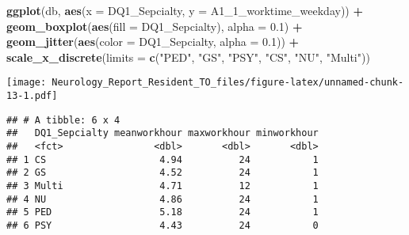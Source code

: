 \documentclass[]{book}
\newenvironment{Shaded}{\begin{snugshade}}{\end{snugshade}}
\newcommand{\DataTypeTok}[1]{\textcolor[rgb]{0.13,0.29,0.53}{#1}}
\newcommand{\DecValTok}[1]{\textcolor[rgb]{0.00,0.00,0.81}{#1}}
\newcommand{\FloatTok}[1]{\textcolor[rgb]{0.00,0.00,0.81}{#1}}
\newcommand{\KeywordTok}[1]{\textcolor[rgb]{0.13,0.29,0.53}{\textbf{#1}}}
\newcommand{\NormalTok}[1]{#1}
\newcommand{\OperatorTok}[1]{\textcolor[rgb]{0.81,0.36,0.00}{\textbf{#1}}}
\newcommand{\StringTok}[1]{\textcolor[rgb]{0.31,0.60,0.02}{#1}}
\begin{document}
\begin{Shaded}
\begin{Highlighting}[]
\KeywordTok{ggplot}\NormalTok{(db, }\KeywordTok{aes}\NormalTok{(}\DataTypeTok{x =}\NormalTok{ DQ1_Sepcialty, }\DataTypeTok{y =}\NormalTok{ A1_}\DecValTok{1}\NormalTok{_worktime_weekday)) }\OperatorTok{+}
\StringTok{  }\KeywordTok{geom_boxplot}\NormalTok{(}\KeywordTok{aes}\NormalTok{(}\DataTypeTok{fill =}\NormalTok{ DQ1_Sepcialty), }\DataTypeTok{alpha =} \FloatTok{0.1}\NormalTok{) }\OperatorTok{+}\StringTok{ }
\StringTok{  }\KeywordTok{geom_jitter}\NormalTok{(}\KeywordTok{aes}\NormalTok{(}\DataTypeTok{color =}\NormalTok{ DQ1_Sepcialty, }\DataTypeTok{alpha =} \FloatTok{0.1}\NormalTok{)) }\OperatorTok{+}
\StringTok{  }\KeywordTok{scale_x_discrete}\NormalTok{(}\DataTypeTok{limits =} \KeywordTok{c}\NormalTok{(}\StringTok{"PED"}\NormalTok{, }\StringTok{"GS"}\NormalTok{, }\StringTok{"PSY"}\NormalTok{, }\StringTok{"CS"}\NormalTok{, }\StringTok{"NU"}\NormalTok{, }\StringTok{"Multi"}\NormalTok{))}
\end{Highlighting}
\end{Shaded}

\texttt{[image: Neurology\_Report\_Resident\_TO\_files/figure-latex/unnamed-chunk-13-1.pdf]}

\begin{Shaded}
\end{Shaded}

\begin{verbatim}
## # A tibble: 6 x 4
##   DQ1_Sepcialty meanworkhour maxworkhour minworkhour
##   <fct>                <dbl>       <dbl>       <dbl>
## 1 CS                    4.94          24           1
## 2 GS                    4.52          24           1
## 3 Multi                 4.71          12           1
## 4 NU                    4.86          24           1
## 5 PED                   5.18          24           1
## 6 PSY                   4.43          24           0
\end{verbatim}
\end{document}
